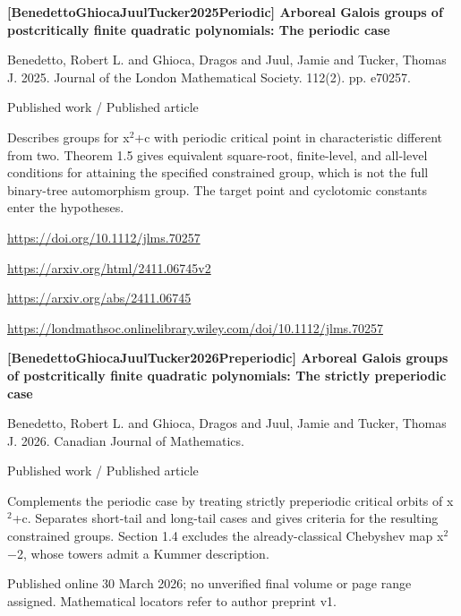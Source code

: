 \documentclass[11pt,a4paper,oneside,openany]{book}
\begin{document}
{\sffamily\bfseries\color{atlasgreen}[BenedettoGhiocaJuulTucker2025Periodic] Arboreal Galois groups of postcritically finite quadratic polynomials: The periodic case}\par
\color{black} Benedetto, Robert L. and Ghioca, Dragos and Juul, Jamie and Tucker, Thomas J. 2025. Journal of the London Mathematical Society. 112(2). pp. e70257.\par
{\small\sffamily\color{atlasgold}Published work / Published article}\par
\color{black} Describes groups for x\ensuremath{{}^2}+c with periodic critical point in characteristic different from two. Theorem 1.5 gives equivalent square-root, finite-level, and all-level conditions for attaining the specified constrained group, which is not the full binary-tree automorphism group. The target point and cyclotomic constants enter the hypotheses.\par
{\footnotesize\url{https://doi.org/10.1112/jlms.70257}}\par
{\footnotesize\url{https://arxiv.org/html/2411.06745v2}}\par
{\footnotesize\url{https://arxiv.org/abs/2411.06745}}\par
{\footnotesize\url{https://londmathsoc.onlinelibrary.wiley.com/doi/10.1112/jlms.70257}}\par
\vspace{9pt}
\hypertarget{ref:BenedettoGhiocaJuulTucker2026Preperiodic}{}
{\sffamily\bfseries\color{atlasgreen}[BenedettoGhiocaJuulTucker2026Preperiodic] Arboreal Galois groups of postcritically finite quadratic polynomials: The strictly preperiodic case}\par
\color{black} Benedetto, Robert L. and Ghioca, Dragos and Juul, Jamie and Tucker, Thomas J. 2026. Canadian Journal of Mathematics.\par
{\small\sffamily\color{atlasgold}Published work / Published article}\par
\color{black} Complements the periodic case by treating strictly preperiodic critical orbits of x\ensuremath{{}^2}+c. Separates short-tail and long-tail cases and gives criteria for the resulting constrained groups. Section 1.4 excludes the already-classical Chebyshev map x\ensuremath{{}^2}\ensuremath{-}2, whose towers admit a Kummer description.\par
{\small Published online 30 March 2026; no unverified final volume or page range assigned. Mathematical locators refer to author preprint v1.}\par
\end{document}
